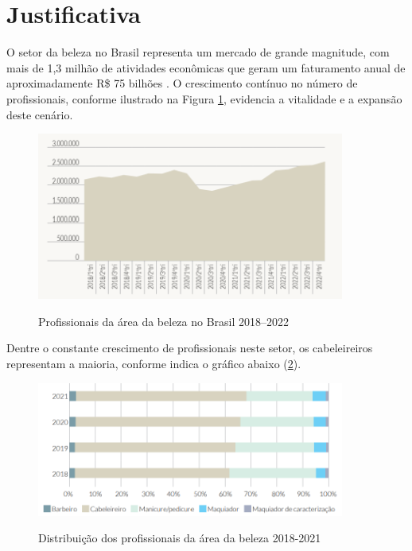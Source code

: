 \section{Justificativa}

O setor da beleza no Brasil representa um mercado de grande magnitude, com mais de 1,3 milhão de atividades econômicas que geram um faturamento anual de aproximadamente R\$ 75 bilhões \cite{sebrae2023forca}. O crescimento contínuo no número de profissionais, conforme ilustrado na Figura \ref{fig:profissionais_brasil}, evidencia a vitalidade e a expansão deste cenário.  


 \begin{figure}[htb]
 	\centering
 	\caption{Profissionais da área da beleza no Brasil 2018–2022}
 	\includegraphics[width=0.9\textwidth]{cap01-Introducao/Images/1.3_grafico_profissionais_brasil}
 	\label{fig:profissionais_brasil}
 \end{figure}
 
 \FloatBarrier
 
Dentre o constante crescimento de profissionais neste setor, os cabeleireiros representam a maioria, conforme indica o gráfico abaixo (\ref{fig:Distribuição_profissionais}).

\begin{figure}[htb]
	\centering
	\caption{Distribuição dos profissionais da área da beleza 2018-2021}
	\includegraphics[width=0.9\textwidth]{cap01-Introducao/Images/1.3_grafico_maioria_cabeleireiros}
	\label{fig:Distribuição_profissionais}
\end{figure}


